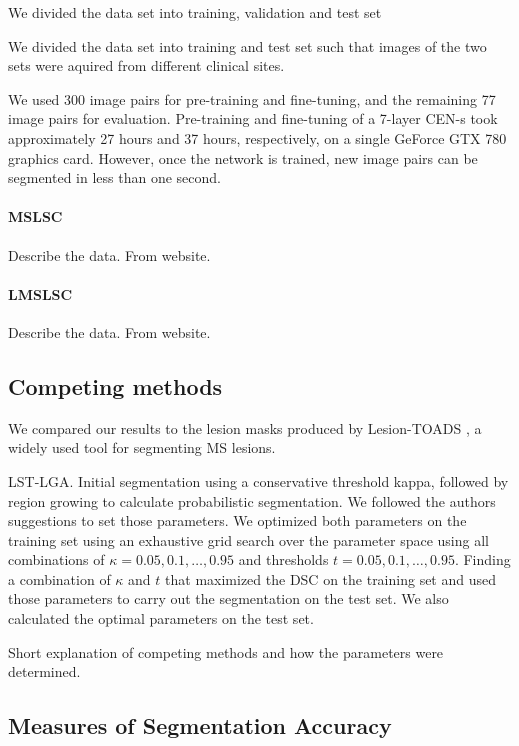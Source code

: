
We divided the data set into training, validation and test set

We divided the data set into training and test set such that images of the two
sets were aquired from different clinical sites.

We used 300 image pairs for pre-training and fine-tuning, and the remaining 77
image pairs for evaluation. Pre-training and fine-tuning of a 7-layer CEN-s took
approximately 27 hours and 37 hours, respectively, on a single GeForce GTX 780
graphics card. However, once the network is trained, new image pairs can be
segmented in less than one second.

\paragraph{MSLSC}
Describe the data. From website.

\paragraph{LMSLSC}
Describe the data. From website.

\subsection{Competing methods}

We compared our results to the lesion masks produced by Lesion-TOADS
\cite{shiee2010topology}, a widely used tool for segmenting MS lesions.

LST-LGA. Initial segmentation using a conservative threshold kappa, followed by
region growing to calculate probabilistic segmentation. We followed the authors
suggestions to set those parameters. We optimized both parameters on the
training set using an exhaustive grid search over the parameter space using all
combinations of $\kappa = {0.05, 0.1, \dotsc, 0.95}$ and thresholds $t = 0.05,
0.1, \dotsc, 0.95$. Finding a combination of $\kappa$ and $t$ that maximized the
DSC on the training set and used those parameters to carry out the segmentation
on the test set. We also calculated the optimal parameters on the test set.

Short explanation of competing methods and how the parameters were determined.

\subsection{Measures of Segmentation Accuracy}

